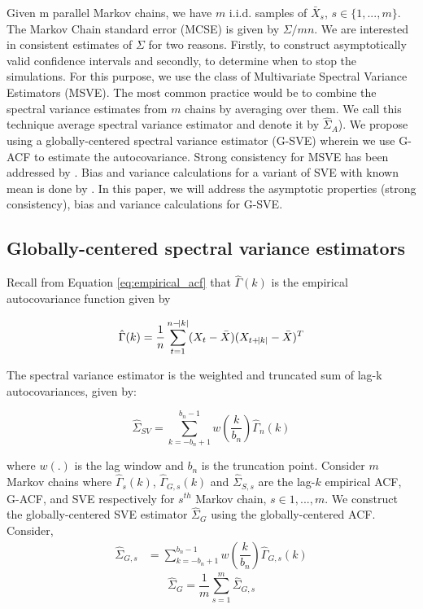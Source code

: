 \documentclass[11pt]{article}
\theoremstyle{remark}
\begin{document}
Given m parallel Markov chains, we have $m$ i.i.d. samples of $\bar{X}_s$, $s \in \{1,..., m\}$. The Markov Chain standard error (MCSE) is given by $\Sigma/mn$. We are interested in consistent estimates of $\Sigma$ for two reasons. Firstly, to construct asymptotically valid confidence intervals and secondly, to determine when to stop the simulations. For this purpose, we use the class of Multivariate Spectral Variance Estimators (MSVE). The most common practice would be to combine the spectral variance estimates from $m$ chains by averaging over them. We call this technique average spectral variance estimator and denote it by $\hat{\Sigma}_A$). We propose using a globally-centered spectral variance estimator (G-SVE) wherein we use G-ACF to estimate the autocovariance. Strong consistency for MSVE has been addressed by \cite{vats:fleg:jon:2018}. Bias and variance calculations for a variant of SVE with known mean is done by \cite{hannan2009multiple}. In this paper, we will address the asymptotic properties (strong consistency), bias and variance calculations for G-SVE. 

\subsection{Globally-centered spectral variance estimators} %
\label{sub:globally_centered_spectral_variance_estimators}


Recall from Equation \ref{eq:empirical_acf} that $\hat{\Gamma}(k)$ is the empirical autocovariance function given by 

\begin{equation}
    \hat{\Gamma}(k) = \dfrac{1}{n}\sum_{t=1}^{n-\abs{k}}(X_t - \bar{X})(X_{t + \abs{k}} - \bar{X})^T
\end{equation}


The spectral variance estimator is the weighted and truncated sum of lag-k autocovariances, given by:

\begin{equation} \label{eq:sve}
    \hat{\Sigma}_{SV} = \sum_{k=-b_n+1}^{b_n-1}w\left(\dfrac{k}{b_n}\right)\hat{\Gamma}_n(k)
\end{equation}

where $w(.)$ is the lag window and $b_n$ is the truncation point. Consider $m$ Markov chains where $\hat{\Gamma}_s(k)$, $\hat{\Gamma}_{G,s}(k)$ and $\hat{\Sigma}_{S, s}$ are the lag-$k$ empirical ACF, G-ACF, and SVE respectively for $s^{th}$ Markov chain, $s\in {1,...,m}$. We construct the globally-centered SVE estimator $\hat{\Sigma}_{G}$ using the globally-centered ACF. Consider, 
%
\begin{align*}
    \hat{\Sigma}_{G,s} &= \sum_{k=-b_n+1}^{b_n-1}w\left(\dfrac{k}{b_n}\right)\hat{\Gamma}_{G,s}(k)
\end{align*}
\[
\hat{\Sigma}_{G} =  \dfrac{1}{m}\sum_{s=1}^{m}\hat{\Sigma}_{G,s}
\]
\end{document}
